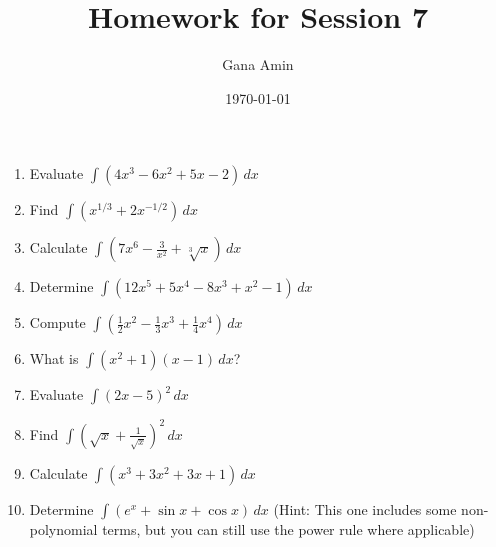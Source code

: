 \documentclass{article}
\begin{document}
\title{Homework for Session 7}
\author{Gana Amin}
\date{\today}
\maketitle

\begin{enumerate}
\item Evaluate $\int (4x^3 - 6x^2 + 5x - 2) \, dx$ 
\item Find $\int (x^{1/3} + 2x^{-1/2}) \, dx$
\item Calculate $\int (7x^6 - \frac{3}{x^2} + \sqrt[3]{x}) \, dx$
\item Determine $\int (12x^5 + 5x^4 - 8x^3 + x^2 - 1) \, dx$
\item Compute $\int (\frac{1}{2}x^2 - \frac{1}{3}x^3 + \frac{1}{4}x^4) \, dx$
\item What is $\int (x^2 + 1)(x - 1) \, dx$?
\item Evaluate $\int (2x - 5)^2 \, dx$
\item Find $\int (\sqrt{x} + \frac{1}{\sqrt{x}})^2 \, dx$
\item Calculate $\int (x^3 + 3x^2 + 3x + 1) \, dx$
\item Determine $\int (e^x + \sin x + \cos x) \, dx$ (Hint: This one includes some non-polynomial terms, but you can still use the power rule where applicable) 
\end{enumerate}
\end{document}
